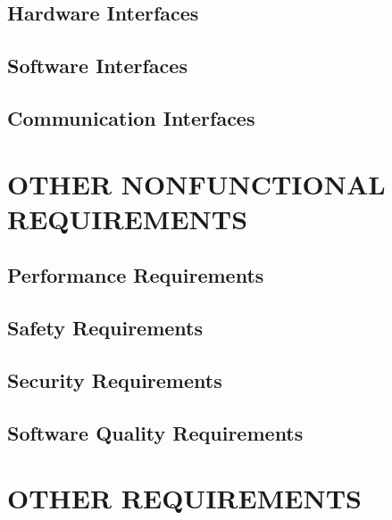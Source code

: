 \documentclass{article}
\begin{document}
\subsection{Hardware Interfaces}
\subsection{Software Interfaces}
\subsection{Communication Interfaces}

\section{OTHER NONFUNCTIONAL REQUIREMENTS}
\subsection{Performance Requirements}

\subsection{Safety Requirements}

\subsection{Security Requirements}

\subsection{Software Quality Requirements}


\section{OTHER REQUIREMENTS}
\end{document}
